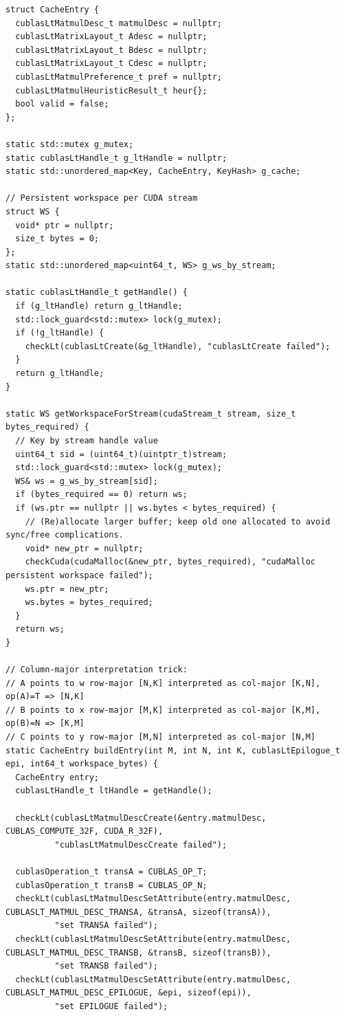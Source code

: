 \begin{tcolorbox}[mybox, title={our model in Level 3 Task 44 — Reported 3.75 $\times$ Speedup}]
\begin{verbatim}
struct CacheEntry {
  cublasLtMatmulDesc_t matmulDesc = nullptr;
  cublasLtMatrixLayout_t Adesc = nullptr;
  cublasLtMatrixLayout_t Bdesc = nullptr;
  cublasLtMatrixLayout_t Cdesc = nullptr;
  cublasLtMatmulPreference_t pref = nullptr;
  cublasLtMatmulHeuristicResult_t heur{};
  bool valid = false;
};

static std::mutex g_mutex;
static cublasLtHandle_t g_ltHandle = nullptr;
static std::unordered_map<Key, CacheEntry, KeyHash> g_cache;

// Persistent workspace per CUDA stream
struct WS {
  void* ptr = nullptr;
  size_t bytes = 0;
};
static std::unordered_map<uint64_t, WS> g_ws_by_stream;

static cublasLtHandle_t getHandle() {
  if (g_ltHandle) return g_ltHandle;
  std::lock_guard<std::mutex> lock(g_mutex);
  if (!g_ltHandle) {
    checkLt(cublasLtCreate(&g_ltHandle), "cublasLtCreate failed");
  }
  return g_ltHandle;
}

static WS getWorkspaceForStream(cudaStream_t stream, size_t bytes_required) {
  // Key by stream handle value
  uint64_t sid = (uint64_t)(uintptr_t)stream;
  std::lock_guard<std::mutex> lock(g_mutex);
  WS& ws = g_ws_by_stream[sid];
  if (bytes_required == 0) return ws;
  if (ws.ptr == nullptr || ws.bytes < bytes_required) {
    // (Re)allocate larger buffer; keep old one allocated to avoid sync/free complications.
    void* new_ptr = nullptr;
    checkCuda(cudaMalloc(&new_ptr, bytes_required), "cudaMalloc persistent workspace failed");
    ws.ptr = new_ptr;
    ws.bytes = bytes_required;
  }
  return ws;
}

// Column-major interpretation trick:
// A points to w row-major [N,K] interpreted as col-major [K,N], op(A)=T => [N,K]
// B points to x row-major [M,K] interpreted as col-major [K,M], op(B)=N => [K,M]
// C points to y row-major [M,N] interpreted as col-major [N,M]
static CacheEntry buildEntry(int M, int N, int K, cublasLtEpilogue_t epi, int64_t workspace_bytes) {
  CacheEntry entry;
  cublasLtHandle_t ltHandle = getHandle();

  checkLt(cublasLtMatmulDescCreate(&entry.matmulDesc, CUBLAS_COMPUTE_32F, CUDA_R_32F),
          "cublasLtMatmulDescCreate failed");

  cublasOperation_t transA = CUBLAS_OP_T;
  cublasOperation_t transB = CUBLAS_OP_N;
  checkLt(cublasLtMatmulDescSetAttribute(entry.matmulDesc, CUBLASLT_MATMUL_DESC_TRANSA, &transA, sizeof(transA)),
          "set TRANSA failed");
  checkLt(cublasLtMatmulDescSetAttribute(entry.matmulDesc, CUBLASLT_MATMUL_DESC_TRANSB, &transB, sizeof(transB)),
          "set TRANSB failed");
  checkLt(cublasLtMatmulDescSetAttribute(entry.matmulDesc, CUBLASLT_MATMUL_DESC_EPILOGUE, &epi, sizeof(epi)),
          "set EPILOGUE failed");


\end{verbatim}
\end{tcolorbox}
